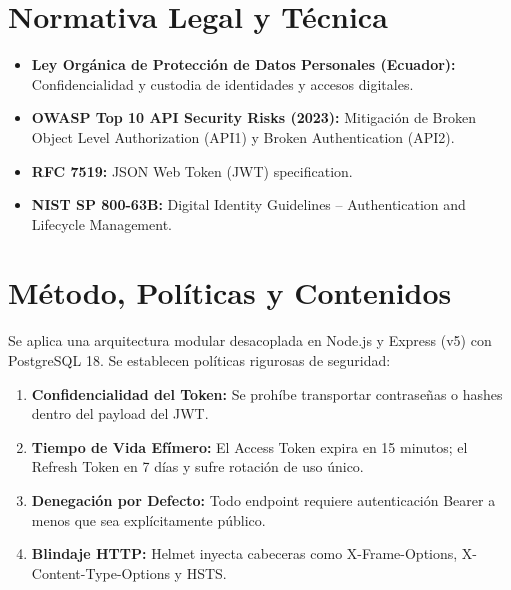 \documentclass[12pt,a4paper]{article}
\begin{document}
\section{Normativa Legal y Técnica}
\begin{itemize}[leftmargin=1.5em, itemsep=2pt, topsep=2pt]
    \item \textbf{Ley Orgánica de Protección de Datos Personales (Ecuador):} Confidencialidad y custodia de identidades y accesos digitales.
    \item \textbf{OWASP Top 10 API Security Risks (2023):} Mitigación de Broken Object Level Authorization (API1) y Broken Authentication (API2).
    \item \textbf{RFC 7519:} JSON Web Token (JWT) specification.
    \item \textbf{NIST SP 800-63B:} Digital Identity Guidelines -- Authentication and Lifecycle Management.
\end{itemize}

\section{Método, Políticas y Contenidos}
Se aplica una arquitectura modular desacoplada en Node.js y Express (v5) con PostgreSQL 18. Se establecen políticas rigurosas de seguridad:
\begin{enumerate}[leftmargin=1.5em, itemsep=1.5pt]
    \item \textbf{Confidencialidad del Token:} Se prohíbe transportar contraseñas o hashes dentro del payload del JWT.
    \item \textbf{Tiempo de Vida Efímero:} El Access Token expira en 15 minutos; el Refresh Token en 7 días y sufre rotación de uso único.
    \item \textbf{Denegación por Defecto:} Todo endpoint requiere autenticación Bearer a menos que sea explícitamente público.
    \item \textbf{Blindaje HTTP:} Helmet inyecta cabeceras como X-Frame-Options, X-Content-Type-Options y HSTS.
\end{enumerate}

\end{document}
